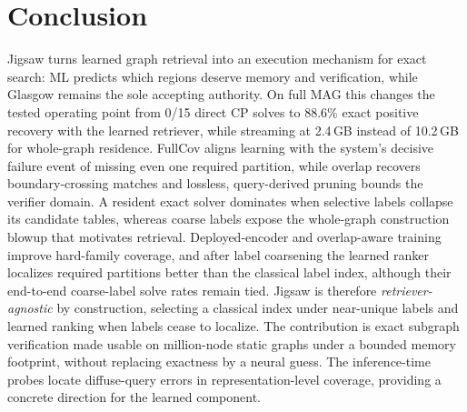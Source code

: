 \documentclass[runningheads]{llncs}
\begin{document}
\section{Conclusion}

Jigsaw turns learned graph retrieval into an execution mechanism for exact search: ML predicts which regions deserve memory and verification, while Glasgow remains the sole accepting authority. On full MAG this changes the tested operating point from 0/15 direct CP solves to 88.6\% exact positive recovery with the learned retriever, while streaming at 2.4\,GB instead of 10.2\,GB for whole-graph residence. FullCov aligns learning with the system's decisive failure event of missing even one required partition, while overlap recovers boundary-crossing matches and lossless, query-derived pruning bounds the verifier domain. A resident exact solver dominates when selective labels collapse its candidate tables, whereas coarse labels expose the whole-graph construction blowup that motivates retrieval. Deployed-encoder and overlap-aware training improve hard-family coverage, and after label coarsening the learned ranker localizes required partitions better than the classical label index, although their end-to-end coarse-label solve rates remain tied. Jigsaw is therefore \emph{retriever-agnostic} by construction, selecting a classical index under near-unique labels and learned ranking when labels cease to localize. The contribution is exact subgraph verification made usable on million-node static graphs under a bounded memory footprint, without replacing exactness by a neural guess. The inference-time probes locate diffuse-query errors in representation-level coverage, providing a concrete direction for the learned component.
\end{document}

